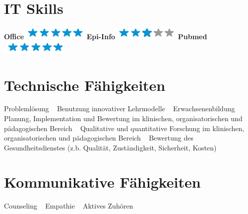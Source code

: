 \documentclass[11pt]{friggeri-cv}
\begin{document}
%
%
\vspace{-10pt}
\begin{aside}
  \section{IT Skills}
  \textbf{Office}\includegraphics[scale=0.40]{img/5stars.png}
  \textbf{Epi-Info}\includegraphics[scale=0.40]{img/3stars.png}
  \textbf{Pubmed}\includegraphics[scale=0.40]{img/5stars.png}
  \section{Technische F\"{a}higkeiten}\vspace{5pt}\footnotesize{
    Probleml\"{o}sung
    ~
    Benutzung innovativer Lehrmodelle
    ~
    Erwachsenenbildung
    ~
    Planung, Implementation und Bewertung im klinischen, organisatorischen und p\"{a}dagogischen Bereich 
    ~
    Qualitative und quantitative Forschung im klinischen, organisatorischen und p\"{a}dagogischen Bereich
    ~
    Bewertung des Gesundheitsdienstes (z.b. Qualit\"{a}t, Zust\"{a}ndigkeit, Sicherheit, Kosten)}
  \section{Kommunikative F\"{a}higkeiten}\vspace{5pt}\footnotesize{
    Counseling
    ~
    Empathie
    ~
    Aktives Zuh\"{o}ren}
\end{aside}

\vspace{-20pt}
\end{document}
